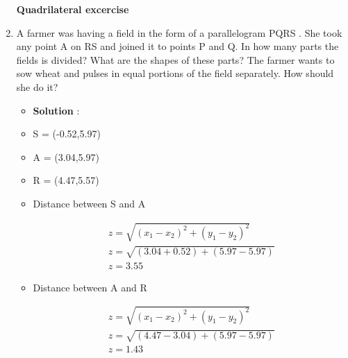 \documentclass[journal,12pt,twocolumn]{IEEEtran}
\begin{document}
\begin{enumerate}[label=\arabic*]
\textbf{Quadrilateral excercise}\\

\item A farmer was having a field in the form of a
parallelogram PQRS . She took any point A on
RS and joined it to points P and Q. In how
many parts the fields is divided? What are the
shapes of these parts? The farmer wants to sow
wheat and pulses in equal portions of the field
separately. How should she do it?
\begin{itemize}
\item \textbf{Solution} :
\begin{center}

\end{center}

\item S = (-0.52,5.97)\\
\item A = (3.04,5.97)\\
\item R = (4.47,5.57)
\item  Distance between S and A

\begin{align*}
z = \sqrt{(x_1 - x_2)^2 + (y_1 - y_2)^2}\\
z = \sqrt{(3.04 + 0.52) + (5.97 - 5.97)}\\
z = 3.55
\end{align*}

\item Distance between A and R

\begin{align*}
z = \sqrt{(x_1 - x_2)^2 + (y_1 - y_2)^2}\\
z = \sqrt{(4.47 - 3.04) + (5.97 - 5.97)}\\
z = 1.43
\end{align*}


\end{itemize}
\end{enumerate}
\end{document}
